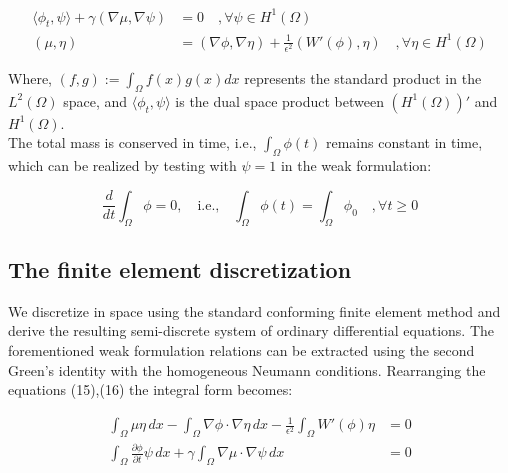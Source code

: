 \documentclass{article}
\begin{document}
\begin{align}
\langle\phi_t, \psi\rangle + \gamma(\nabla \mu, \nabla \psi) &= 0 \quad ,\forall \psi \in H^1(\Omega) \\
(\mu, \eta) &= (\nabla\phi, \nabla\eta) + \frac{1}{\epsilon^2}(W'(\phi), \eta) \quad ,\forall \eta \in H^1(\Omega)
\end{align}

Where, $(f, g) := \int_\Omega f(x)g(x)dx$ represents the standard product in the $L^2(\Omega)$ space, and $\langle\phi_t, \psi\rangle$ is the dual space product between $(H^1(\Omega))'$ and $H^1(\Omega).$\\


The total mass is conserved in time, i.e., $\int_\Omega \phi(t)$ remains constant in time, which can be realized by testing with $\psi = 1$ in the weak formulation:

\begin{equation}
\frac{d}{dt}\int_\Omega \phi = 0, \quad \text{i.e.,} \quad \int_\Omega \phi(t) = \int_\Omega \phi_0 \quad ,\forall t \geq 0
\end{equation}




\subsection{The finite element discretization}
We discretize in space using the standard conforming finite element method and derive the resulting semi-discrete system of ordinary differential equations. The forementioned weak formulation relations can be extracted using the second Green’s identity with the homogeneous Neumann conditions. Rearranging the equations (15),(16) the integral form becomes:

\begin{align}
\int_\Omega \mu\eta \, dx -\int_\Omega \nabla\phi\cdot \nabla\eta \, dx - \frac{1}{\epsilon^2}\int_\Omega  W'(\phi)\eta
&= 0\\
\int_\Omega\frac{\partial \phi}{\partial t} \psi \, dx + \gamma\int_\Omega \nabla \mu \cdot \nabla \psi \, dx &= 0
\end{align}
\end{document}
